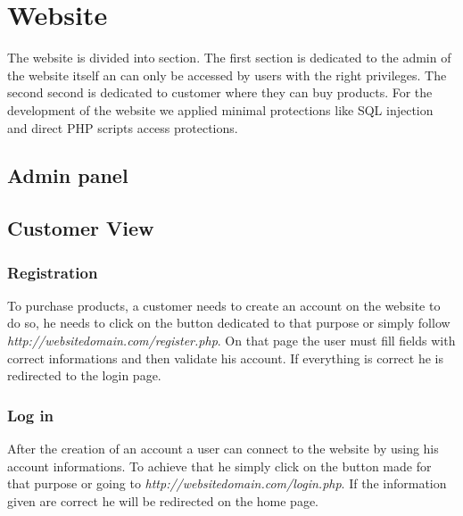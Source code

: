 \documentclass{article}
\begin{document}
\section{Website}
The website is divided into section. The first section is dedicated to the admin of the website itself an can only be accessed by users with the right privileges. The second second is dedicated to customer where they can buy products. For the development of the website we applied minimal protections like SQL injection and direct PHP scripts access protections.

\subsection{Admin panel}

\subsection{Customer View}

\subsubsection{Registration}
To purchase products, a customer needs to create an account on the website to do so, he needs to click on the button dedicated to that purpose or simply follow \textit{http://websitedomain.com/register.php}. On that page the user must fill fields with correct informations and then validate his account. If everything is correct he is redirected to the login page.
 
\subsubsection{Log in}
After the creation of an account a user can connect to the website by using his account informations. To achieve that he simply click on the button made for that purpose or going to \textit{http://websitedomain.com/login.php}. If the information given are correct he will be redirected on the home page.
 
\end{document}
